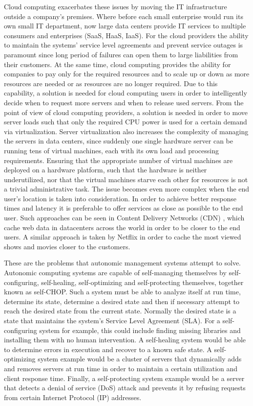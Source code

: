 Cloud computing exacerbates these issues by moving the IT infrastructure outside a company's premises. Where before each small enterprise would run its own small IT department, now large data centers provide IT services to multiple consumers and enterprises (SaaS, HaaS, IaaS). For the cloud providers the ability to maintain the systems' service level agreements and prevent service outages is paramount since long period of failures can open them to large liabilities from their customers. At the same time, cloud computing provides the ability for companies to pay only for the required resources and to scale up or down as more resources are needed or as resources are no longer required. Due to this capability, a solution is needed for cloud computing users in order to intelligently decide when to request more servers and when to release used servers. From the point of view of cloud computing providers, a solution is needed in order to move server loads such that only the required CPU power is used for a certain demand via virtualization. Server virtualization also increases the complexity of managing the servers in data centers, since suddenly one single hardware server can be running tens of virtual machines, each with its own load and processing requirements. Ensuring that the appropriate number of virtual machines are deployed on a hardware platform, such that the hardware is neither underutilized, nor that the virtual machines starve each other for resources is not a trivial administrative task. The issue becomes even more complex when the end user's location is taken into consideration. In order to achieve better response times and latency it is preferable to offer services as close as possible to the end user. Such approaches can be seen in Content Delivery Networks (CDN) \cite{akamai}, which cache web data in datacenters across the world in order to be closer to the end users. A similar approach is taken by Netflix in order to cache the most viewed shows and movies closer to the customers.

These are the problems that autonomic management systems attempt to solve. Autonomic computing systems are capable of self-managing themselves by self-configuring, self-healing, self-optimizing and self-protecting themselves, together known as self-CHOP. Such a system must be able to analyze itself at run time, determine its state, determine a desired state and then if necessary attempt to reach the desired state from the current state. Normally the desired state is a state that maintains the system's Service Level Agreement (SLA). For a self-configuring system for example, this could include finding missing libraries and installing them with no human intervention. A self-healing system would be able to determine errors in execution and recover to a known safe state. A self-optimizing system example would be a cluster of servers that dynamically adds and removes servers at run time in order to maintain a certain utilization and client response time. Finally, a self-protecting system example would be a server that detects a denial of service (DoS) attack and prevents it by refusing requests from certain Internet Protocol (IP) addresses.

